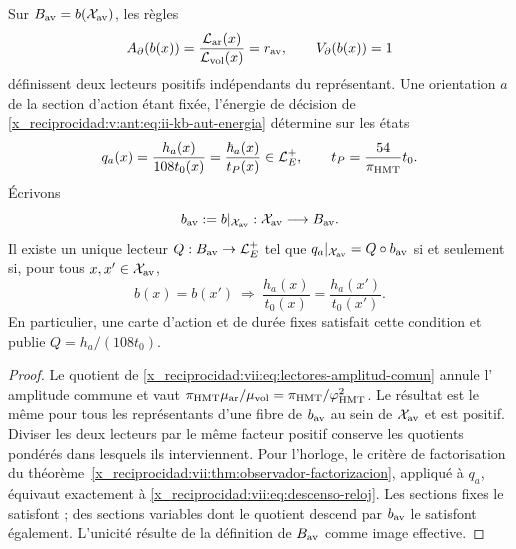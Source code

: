\begin{proposition}
\label{x_reciprocidad:vii:prop:lectores-frontera-explicitos}
Sur \(B_{\rm av}=b(\mathcal X_{\rm av})\), les règles
\begin{equation}
 A_\partial(b(x))
 =\frac{\mathcal L_{\rm ar}(x)}{\mathcal L_{\rm vol}(x)}
 =r_{\rm av},\qquad V_\partial(b(x))=1
 \label{x_reciprocidad:vii:eq:lectores-normalizados}
\end{equation}
définissent deux lecteurs positifs indépendants du représentant.
Une orientation \(a\) de la section d'action étant fixée, l'énergie de
décision de \eqref{x_reciprocidad:v:ant:eq:ii-kb-aut-energia} détermine sur les états
\begin{equation}
 q_a(x)=\frac{h_a(x)}{108t_0(x)}
       =\frac{\hbar_a(x)}{t_P(x)}\in\mathcal L_E^+,
 \qquad t_P=\frac{54}{\pi_{\rm HMT}}t_0.
 \label{x_reciprocidad:vii:eq:lector-q-accion}
\end{equation}
Écrivons
\[
 b_{\rm av}:=b|_{\mathcal X_{\rm av}}:
 \mathcal X_{\rm av}\longrightarrow B_{\rm av}.
\]
Il existe un unique lecteur \(Q:B_{\rm av}\to\mathcal L_E^+\) tel que
\(q_a|_{\mathcal X_{\rm av}}=Q\circ b_{\rm av}\)
si et seulement si, pour tous \(x,x'\in\mathcal X_{\rm av}\),
\begin{equation}
 b(x)=b(x')\ \Longrightarrow\
 \frac{h_a(x)}{t_0(x)}=\frac{h_a(x')}{t_0(x')}.
 \label{x_reciprocidad:vii:eq:descenso-reloj}
\end{equation}
En particulier, une carte d'action et de durée fixes satisfait cette
condition et publie \(Q=h_a/(108t_0)\).
\end{proposition}
\begin{proof}
Le quotient de \eqref{x_reciprocidad:vii:eq:lectores-amplitud-comun} annule l'
amplitude commune et vaut
\(\pi_{\rm HMT}\mu_{\rm ar}/\mu_{\rm vol}
=\pi_{\rm HMT}/\varphi_{\rm HMT}^2\).
Le résultat est le même pour tous les représentants d'une fibre
de \(b_{\rm av}\) au sein de \(\mathcal X_{\rm av}\) et est positif.
Diviser les deux lecteurs par le même facteur positif
conserve les quotients pondérés dans lesquels ils interviennent.
Pour l'horloge, le critère de factorisation du
théorème~\ref{x_reciprocidad:vii:thm:observador-factorizacion}, appliqué à \(q_a\),
équivaut exactement à \eqref{x_reciprocidad:vii:eq:descenso-reloj}. Les sections
fixes le satisfont ; des sections variables dont le
quotient descend par \(b_{\rm av}\) le satisfont également. L'unicité résulte de la définition
de \(B_{\rm av}\) comme image effective.
\end{proof}

